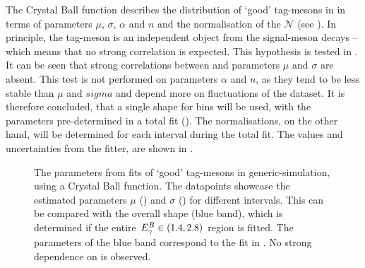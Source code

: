 The Crystal Ball function describes the distribution of `good' tag-\B mesons in \Mbc in terms of parameters $\mu$, $\sigma$, $\alpha$ and $n$ and the normalisation of the \PDF $\mathcal{N}$ (see ).
In principle, the tag-\B meson is an independent object from the signal-\B meson decays -- which means that no strong \EB correlation is expected.
This hypothesis is tested in .
It can be seen that strong correlations between \EB and parameters $\mu$ and $\sigma$ are absent.
This test is not performed on parameters $\alpha$ and $n$, as they tend to be less stable than $\mu$ and $sigma$ and depend more on fluctuations of the dataset.
It is therefore concluded, that a single \Mbc shape for \EB bins will be used, with the parameters pre-determined in a total fit ().
The normalisations, on the other hand, will be determined for each \EB interval during the total fit.
The values and uncertainties from the fitter, are shown in .

\begin{figure}[htbp!]
    \caption{\label{fig:crystal_ball_par_test}The parameters from \Mbc fits of `good' tag-\B mesons in generic-\BB simulation, using a Crystal Ball function.
    The datapoints showcase the estimated parameters $\mu$ () and $\sigma$ () for different
    \EB intervals.
    This can be compared with the overall shape (blue band), which is determined if the entire ${E^B_{\gamma}}\in(1.4,2.8)$ region is fitted.
    The parameters of the blue band correspond to the fit in .
    No strong dependence on \EB is observed.
    }
\end{figure}

